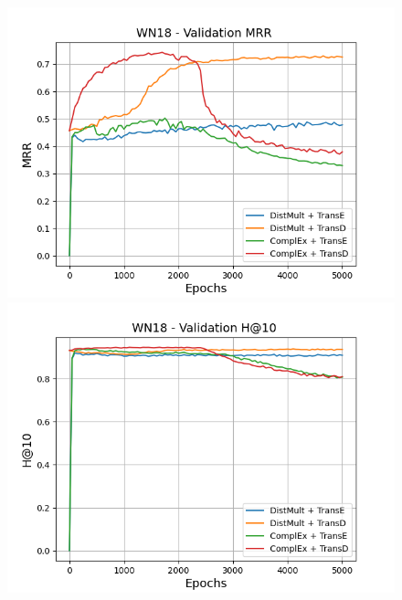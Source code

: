 \begin{figure}
    \centering
    \begin{minipage}{.45\textwidth}
      \centering
      \includegraphics[width=0.9\linewidth]{figures/results/gan_train/pretrained/uncertainty/max/entropy/wn18/5k_epochs/uncertainty_wn18_mrrs.png}
    \end{minipage}%
    \begin{minipage}{.45\textwidth}
      \centering
      \includegraphics[width=0.9\linewidth]{figures/results/gan_train/pretrained/uncertainty/max/entropy/wn18/5k_epochs/uncertainty_wn18_hit10.png}
    \end{minipage}
    

\end{figure}
